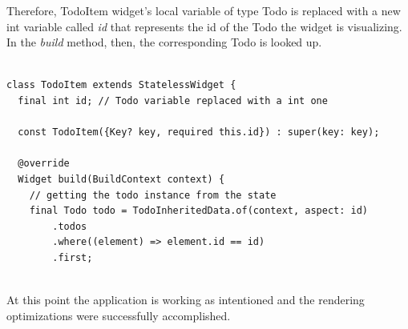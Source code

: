 Therefore, TodoItem widget's local variable of type Todo is replaced with a new int variable called \textit{id} that represents the id of the Todo the widget is visualizing. In the \textit{build} method, then, the corresponding Todo is looked up.
\mbox{}\\
\begin{code}
\mbox{}
\label{code:2.48}
\begin{verbatim}

class TodoItem extends StatelessWidget {
  final int id; // Todo variable replaced with a int one

  const TodoItem({Key? key, required this.id}) : super(key: key);

  @override
  Widget build(BuildContext context) {
  	// getting the todo instance from the state
    final Todo todo = TodoInheritedData.of(context, aspect: id)
        .todos
        .where((element) => element.id == id)
        .first;
\end{verbatim}
\end{code}
\mbox{}\\
At this point the application is working as intentioned and the rendering optimizations were successfully accomplished. \\


